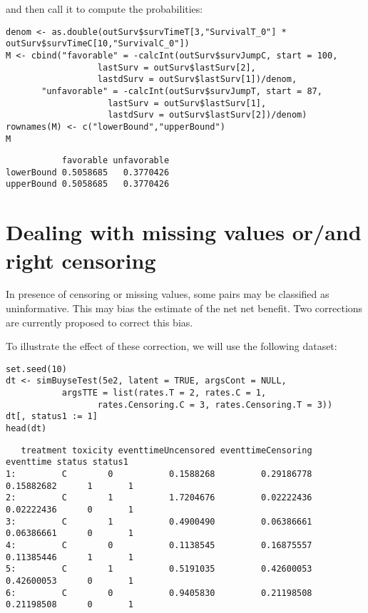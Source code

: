 \documentclass[12pt]{article}
\begin{document}
and then call it to compute the probabilities:
\lstset{language=r,label= ,caption= ,captionpos=b,numbers=none}
\begin{lstlisting}
denom <- as.double(outSurv$survTimeT[3,"SurvivalT_0"] * outSurv$survTimeC[10,"SurvivalC_0"])
M <- cbind("favorable" = -calcInt(outSurv$survJumpC, start = 100, 
				  lastSurv = outSurv$lastSurv[2],
				  lastdSurv = outSurv$lastSurv[1])/denom,
	   "unfavorable" = -calcInt(outSurv$survJumpT, start = 87, 
				    lastSurv = outSurv$lastSurv[1],
				    lastdSurv = outSurv$lastSurv[2])/denom)
rownames(M) <- c("lowerBound","upperBound")
M
\end{lstlisting}

\begin{verbatim}
           favorable unfavorable
lowerBound 0.5058685   0.3770426
upperBound 0.5058685   0.3770426
\end{verbatim}

\clearpage

\section{Dealing with missing values or/and right censoring}
\label{sec:orge77ad2e}

In presence of censoring or missing values, some pairs may be
classified as uninformative. This may bias the estimate of the net net
benefit. Two corrections are currently proposed to correct this bias.

\bigskip

To illustrate the effect of these correction, we will use the
following dataset:
\lstset{language=r,label= ,caption= ,captionpos=b,numbers=none}
\begin{lstlisting}
set.seed(10)
dt <- simBuyseTest(5e2, latent = TRUE, argsCont = NULL,
		   argsTTE = list(rates.T = 2, rates.C = 1,
				  rates.Censoring.C = 3, rates.Censoring.T = 3))
dt[, status1 := 1]
head(dt)
\end{lstlisting}

\begin{verbatim}
   treatment toxicity eventtimeUncensored eventtimeCensoring  eventtime status status1
1:         C        0           0.1588268         0.29186778 0.15882682      1       1
2:         C        1           1.7204676         0.02222436 0.02222436      0       1
3:         C        1           0.4900490         0.06386661 0.06386661      0       1
4:         C        0           0.1138545         0.16875557 0.11385446      1       1
5:         C        1           0.5191035         0.42600053 0.42600053      0       1
6:         C        0           0.9405830         0.21198508 0.21198508      0       1
\end{verbatim}
\end{document}
